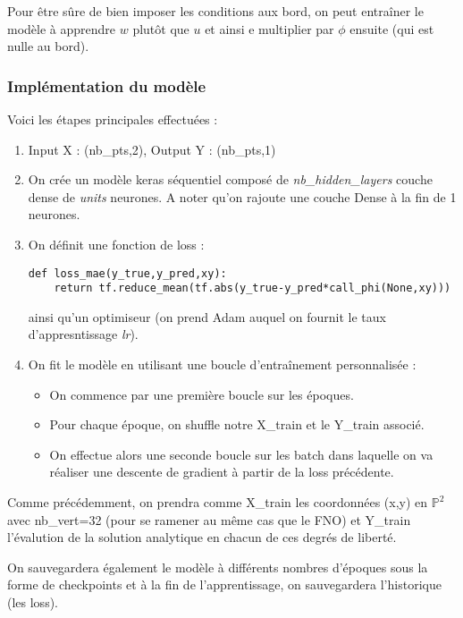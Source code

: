 Pour être sûre de bien imposer les conditions aux bord, on peut entraîner le modèle à apprendre $w$ plutôt que $u$ et ainsi e multiplier par $\phi$ ensuite (qui est nulle au bord). 

\subsubsection{Implémentation du modèle}

Voici les étapes principales effectuées :
\begin{enumerate}[label=\textbullet]
	\item Input X : (nb\_pts,2), Output Y : (nb\_pts,1)  
	\item On crée un modèle keras séquentiel composé de \textit{nb\_hidden\_layers} couche dense de \textit{units} neurones. A noter qu'on rajoute une couche Dense à la fin de 1 neurones.
	\item On définit une fonction de loss :
\begin{lstlisting}
def loss_mae(y_true,y_pred,xy):
	return tf.reduce_mean(tf.abs(y_true-y_pred*call_phi(None,xy)))
\end{lstlisting}
	ainsi qu'un optimiseur (on prend Adam auquel on fournit le taux d'appresntissage \textit{lr}).
	\item On fit le modèle en utilisant une boucle d'entraînement personnalisée :
	\begin{itemize}
		\item On commence par une première boucle sur les époques.
		\item Pour chaque époque, on shuffle notre X\_train et le Y\_train associé.
		\item On effectue alors une seconde boucle sur les batch dans laquelle on va réaliser une descente de gradient à partir de la loss précédente.
	\end{itemize}
\end{enumerate}

\begin{Rem}
	Comme précédemment, on prendra comme X\_train les coordonnées (x,y) en $\mathbb{P}^2$ avec nb\_vert=32 (pour se ramener au même cas que le FNO) et Y\_train l'évalution de la solution analytique en chacun de ces degrés de liberté.
	
	On sauvegardera également le modèle à différents nombres d'époques sous la forme de checkpoints et à la fin de l'apprentissage, on sauvegardera l'historique (les loss).
\end{Rem}

